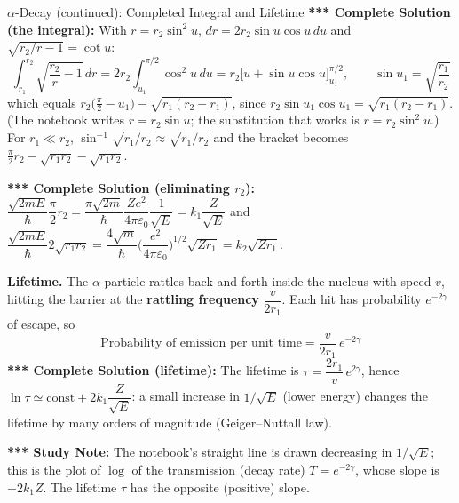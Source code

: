 \documentclass[11pt,a4paper]{article}
\begin{document}
\begin{prob}{$\alpha$-Decay (continued): Completed Integral and Lifetime}
\textbf{*** Complete Solution (the integral):} With $r=r_2\sin^2u$, $dr = 2r_2\sin u\cos u\,du$ and $\sqrt{r_2/r-1}=\cot u$:
\[
\int_{r_1}^{r_2}\sqrt{\frac{r_2}r-1}\,dr = 2r_2\int_{u_1}^{\pi/2}\cos^2u\,du = r_2\Big[u+\sin u\cos u\Big]_{u_1}^{\pi/2}, \qquad \sin u_1 = \sqrt{\frac{r_1}{r_2}}
\]
which equals $r_2\big(\frac\pi2-u_1\big)-\sqrt{r_1(r_2-r_1)}$, since $r_2\sin u_1\cos u_1 = \sqrt{r_1(r_2-r_1)}$. (The notebook writes $r=r_2\sin u$; the substitution that works is $r=r_2\sin^2u$.) For $r_1\ll r_2$, $\sin^{-1}\sqrt{r_1/r_2}\approx\sqrt{r_1/r_2}$ and the bracket becomes $\frac\pi2r_2-\sqrt{r_1r_2}-\sqrt{r_1r_2}$.

\textbf{*** Complete Solution (eliminating $r_2$):} $\dfrac{\sqrt{2mE}}\hbar\dfrac\pi2r_2 = \dfrac{\pi\sqrt{2m}}{\hbar}\dfrac{Ze^2}{4\pi\varepsilon_0}\dfrac1{\sqrt E} = k_1\dfrac Z{\sqrt E}$ and $\dfrac{\sqrt{2mE}}\hbar2\sqrt{r_1r_2} = \dfrac{4\sqrt m}{\hbar}\Big(\dfrac{e^2}{4\pi\varepsilon_0}\Big)^{1/2}\sqrt{Zr_1} = k_2\sqrt{Zr_1}$. \checkmark

\textbf{Lifetime.} The $\alpha$ particle rattles back and forth inside the nucleus with speed $v$, hitting the barrier at the \textbf{rattling frequency} $\dfrac v{2r_1}$. Each hit has probability $e^{-2\gamma}$ of escape, so
\[
\text{Probability of emission per unit time} = \frac{v}{2r_1}\,e^{-2\gamma}
\]
\textbf{*** Complete Solution (lifetime):} The lifetime is $\tau = \dfrac{2r_1}{v}\,e^{2\gamma}$, hence $\ln\tau\simeq\text{const}+2k_1\dfrac{Z}{\sqrt E}$: a small increase in $1/\sqrt E$ (lower energy) changes the lifetime by many orders of magnitude (Geiger--Nuttall law).

\begin{center}
\end{center}
\textbf{*** Study Note:} The notebook's straight line is drawn decreasing in $1/\sqrt E$; this is the plot of $\log$ of the transmission (decay rate) $T=e^{-2\gamma}$, whose slope is $-2k_1Z$. The lifetime $\tau$ has the opposite (positive) slope.
\end{prob}
\end{document}
